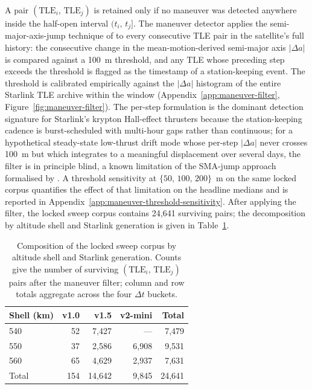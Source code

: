 \documentclass[10pt, letterpaper]{article}
\begin{document}
A pair $(\mathrm{TLE}_{i},\,\mathrm{TLE}_{j})$ is retained only if
no maneuver was detected anywhere inside the half-open interval
$(t_{i},\,t_{j}]$. The maneuver detector applies the
semi-major-axis-jump technique of \citet{lemmens2014} to every
consecutive TLE pair in the satellite's full history: the
consecutive change in the mean-motion-derived semi-major axis
$|\Delta a|$ is compared against a 100~m threshold, and any TLE
whose preceding step exceeds the threshold is flagged as the
timestamp of a station-keeping event. The threshold is calibrated
empirically against the $|\Delta a|$ histogram of the entire
Starlink TLE archive within the window
(Appendix~\ref{app:maneuver-filter},
Figure~\ref{fig:maneuver-filter}). The per-step formulation is the
dominant detection signature for Starlink's krypton Hall-effect
thrusters because the station-keeping cadence is burst-scheduled with
multi-hour gaps rather than continuous; for a hypothetical
steady-state low-thrust drift mode whose per-step $|\Delta a|$ never
crosses 100~m but which integrates to a meaningful displacement over
several days, the filter is in principle blind, a known limitation of
the SMA-jump approach formalised by \citet[\S 3.2]{lemmens2014}.
A threshold sensitivity at $\{50,\,100,\,200\}$~m on the same locked
corpus quantifies the effect of that limitation on the headline
medians and is reported in
Appendix~\ref{app:maneuver-threshold-sensitivity}.
After applying the filter, the
locked sweep corpus contains 24{,}641 surviving pairs; the
decomposition by altitude shell and Starlink generation is given in
Table~\ref{tab:corpus}.

\begin{table}[ht]
  \centering
  \caption{Composition of the locked sweep corpus by altitude shell
  and Starlink generation. Counts give the number of surviving
  $(\mathrm{TLE}_{i},\,\mathrm{TLE}_{j})$ pairs after the maneuver
  filter; column and row totals aggregate across the four
  $\Delta t$ buckets.}
  \label{tab:corpus}
  \begin{tabular}{lrrrr}
    \toprule
    Shell (km) & v1.0 & v1.5 & v2-mini & Total \\
    \midrule
    540   &  52 & 7{,}427 & ---     & 7{,}479 \\
    550   &  37 & 2{,}586 & 6{,}908 & 9{,}531 \\
    560   &  65 & 4{,}629 & 2{,}937 & 7{,}631 \\
    \midrule
    Total & 154 & 14{,}642 & 9{,}845 & 24{,}641 \\
    \bottomrule
  \end{tabular}
\end{table}
\end{document}
